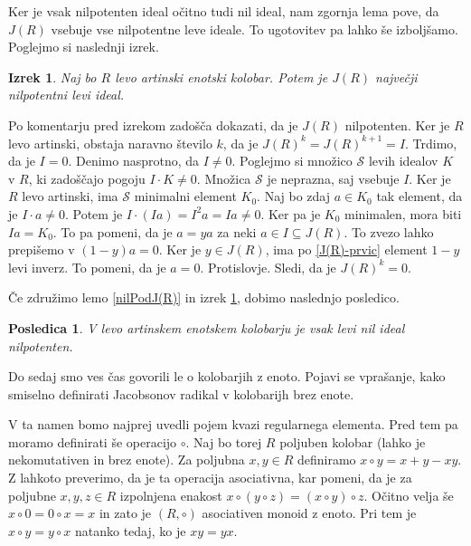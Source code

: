 \documentclass[a4paper, 12pt]{amsart}
\theoremstyle{definition} %
\theoremstyle{plain} %
\newtheorem{izrek}[definicija]{Izrek}
\newtheorem{posledica}[definicija]{Posledica}
\begin{document}
Ker je vsak nilpotenten ideal očitno tudi nil ideal, nam zgornja lema pove, da $J(R)$ vsebuje vse nilpotentne leve ideale. To ugotovitev pa lahko še izboljšamo. Poglejmo si naslednji izrek.

\begin{izrek}
\label{J(R)nilpotenten-levoArtinski}
Naj bo $R$ levo artinski enotski kolobar. Potem je $J(R)$ največji nilpotentni levi ideal.
\end{izrek}

\proof
Po komentarju pred izrekom zadošča dokazati, da je $J(R)$ nilpotenten. Ker je $R$ levo artinski, obstaja naravno število $k$, da je $J(R)^k = J(R) ^{k+1} = I$. Trdimo, da je $I=0$. Denimo nasprotno, da $I\neq 0$. Poglejmo si množico $\mathcal{S}$ levih idealov $K$ v $R$, ki zadoščajo pogoju $I\cdot K \neq 0$. Množica $\mathcal{S}$ je neprazna, saj vsebuje $I$. Ker je $R$ levo artinski, ima $\mathcal{S}$ minimalni element $K_0$. Naj bo zdaj $a\in K_0$ tak element, da je $I\cdot a \neq 0$. Potem je $I\cdot (Ia) = I^2 a = Ia \neq 0$. Ker pa je $K_0$ minimalen, mora biti $Ia = K_0$. To pa pomeni, da je $a = ya$ za neki $a\in I \subseteq J(R)$. To zvezo lahko prepišemo v $(1-y)a = 0$. Ker je $y\in J(R)$, ima po \ref{J(R)-prvic} element $1-y$ levi inverz. To pomeni, da je $a=0$. Protislovje. Sledi, da je $J(R)^k = 0$.
\endproof

Če združimo lemo \ref{nilPodJ(R)} in izrek \ref{J(R)nilpotenten-levoArtinski}, dobimo naslednjo posledico.

\begin{posledica}
V levo artinskem enotskem kolobarju je vsak levi nil ideal nilpotenten.
\end{posledica}

Do sedaj smo ves čas govorili le o kolobarjih z enoto. Pojavi se vprašanje, kako smiselno definirati Jacobsonov radikal v kolobarijh brez enote. 

V ta namen bomo najprej uvedli pojem kvazi regularnega elementa. Pred tem pa moramo definirati še operacijo $\circ$. Naj bo torej $R$ poljuben kolobar (lahko je nekomutativen in brez enote). Za poljubna $x,y\in R$ definiramo $x\circ y = x+y-xy$. Z lahkoto preverimo, da je ta operacija asociativna, kar pomeni, da je za poljubne $x,y,z\in R$ izpolnjena enakost $x\circ(y\circ z) = (x\circ y) \circ z$. Očitno velja še $x \circ 0 = 0 \circ x = x$ in zato je $(R,\circ )$ asociativen monoid z enoto. Pri tem je $x\circ y = y\circ x$ natanko tedaj, ko je $xy = yx$.
\end{document}
